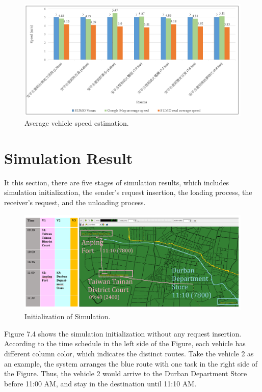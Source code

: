\documentclass[12pt]{ksthesis}
\begin{document}
\begin{thesis}
{\begin{figure}[t]
\centering
\includegraphics[width=1.0\textwidth]{./Thesis_figures/F7-3_speedEstimation.PNG}
\caption{\large Average vehicle speed estimation.}
\vspace{0.5cm}
\label{Fig:Average_vehicleSpeedEstimation}
\end{figure}

\section{Simulation Result}
It this section, there are five stages of simulation results, which includes simulation initialization, the sender’s request insertion, the loading process, the receiver’s request, and the unloading process.

\begin{figure}[t]
\centering
\includegraphics[width=1.0\textwidth]{./Thesis_figures/F7-4_initialization.PNG}
\caption{\large Initialization of Simulation.}
\vspace{0.5cm}
\label{Fig:Initialization_of_Simulation}
\end{figure}

Figure 7.4 shows the simulation initialization without any request insertion. According to the time schedule in the left side of the Figure, each vehicle has different column color, which indicates the distinct routes. Take the vehicle 2 as an example, the system arranges the blue route with one task in the right side of the Figure. Thus, the vehicle 2 would arrive to the Durban Department Store before 11:00 AM, and stay in the destination until 11:10 AM.




}
\end{thesis}
\end{document}
